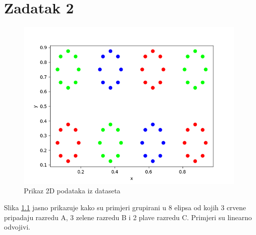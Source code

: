 \documentclass[times, utf8, seminar]{fer}
\begin{document}
\chapter{Zadatak 2}
\begin{figure}[H]
    \centering
    \includegraphics[scale=0.75]{img/zad_2.png}
    \caption[Caption for LOF]{Prikaz 2D podataka iz dataseta\footnotemark}
    \label{zad2:img}
\end{figure}
Slika \ref{zad2:img} jasno prikazuje kako su primjeri grupirani u 8 elipsa od kojih 3 crvene pripadaju razredu A, 3 zelene razredu B i 2 plave razredu C. Primjeri su linearno odvojivi. 
\end{document}
